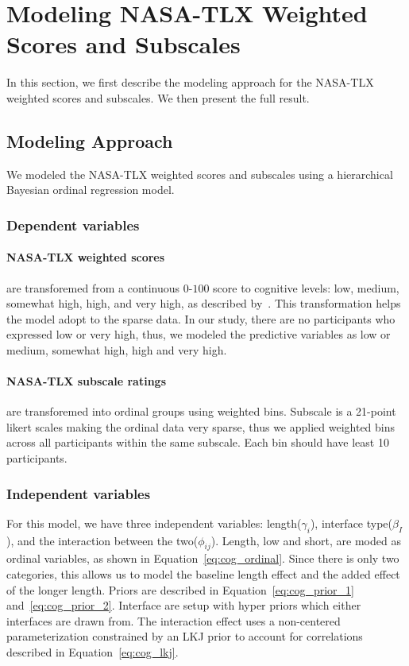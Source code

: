 \section{Modeling NASA-TLX Weighted Scores and Subscales}
In this section, we first describe the modeling approach for the NASA-TLX weighted scores and subscales. We then present the full result.

\subsection{Modeling Approach}
We modeled the NASA-TLX weighted scores and subscales using a hierarchical Bayesian ordinal regression model. 

\subsubsection{Dependent variables}
\paragraph{NASA-TLX weighted scores} are transforemed from a continuous $0$-$100$ score to cognitive levels: low, medium, somewhat high, high, and very high, as described by~\textcite{hart1988development}. This transformation helps the model adopt to the sparse data. In our study, there are no participants who expressed low or very high, thus, we modeled the predictive variables as low or medium, somewhat high, high and very high. 

\paragraph{NASA-TLX subscale ratings} are transforemed into ordinal groups using weighted bins. Subscale is a 21-point likert scales making the ordinal data very sparse, thus we applied weighted bins across all participants within the same subscale. Each bin should have least 10 participants.

\subsubsection{Independent variables}
For this model, we have three independent variables: length($\gamma_i$), interface type($\beta_I$), and the interaction between the two($\phi_{ij}$). Length, low and short, are moded as ordinal variables, as shown in Equation~\ref{eq:cog_ordinal}. Since there is only two categories, this allows us to model the baseline length effect and the added effect of the longer length. Priors are described in Equation~\ref{eq:cog_prior_1} and~\ref{eq:cog_prior_2}. Interface are setup with hyper priors which either interfaces are drawn from. The interaction effect uses a non-centered parameterization constrained by an LKJ prior to account for correlations described in Equation~\ref{eq:cog_lkj}.

